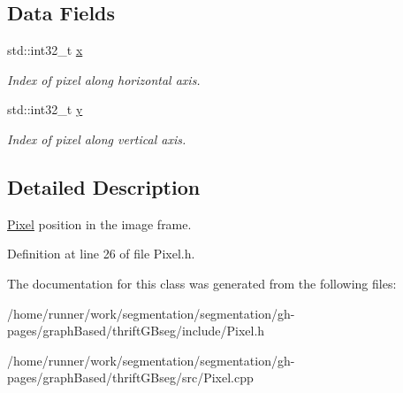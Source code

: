 \subsection*{Data Fields}
\begin{DoxyCompactItemize}
\item 
\mbox{\label{classyarp_1_1sig_1_1Pixel_ad3071410597bc7271a53b7df7bc796fc}} 
std\+::int32\+\_\+t \hyperlink{classyarp_1_1sig_1_1Pixel_ad3071410597bc7271a53b7df7bc796fc}{x}
\begin{DoxyCompactList}\small\item\em Index of pixel along horizontal axis. \end{DoxyCompactList}\item 
\mbox{\label{classyarp_1_1sig_1_1Pixel_a603768ad1ecf291c12d2f56e0828625c}} 
std\+::int32\+\_\+t \hyperlink{classyarp_1_1sig_1_1Pixel_a603768ad1ecf291c12d2f56e0828625c}{y}
\begin{DoxyCompactList}\small\item\em Index of pixel along vertical axis. \end{DoxyCompactList}\end{DoxyCompactItemize}


\subsection{Detailed Description}
\hyperlink{classyarp_1_1sig_1_1Pixel}{Pixel} position in the image frame. 

Definition at line 26 of file Pixel.\+h.



The documentation for this class was generated from the following files\+:\begin{DoxyCompactItemize}
\item 
/home/runner/work/segmentation/segmentation/gh-\/pages/graph\+Based/thrift\+G\+Bseg/include/Pixel.\+h\item 
/home/runner/work/segmentation/segmentation/gh-\/pages/graph\+Based/thrift\+G\+Bseg/src/Pixel.\+cpp\end{DoxyCompactItemize}

